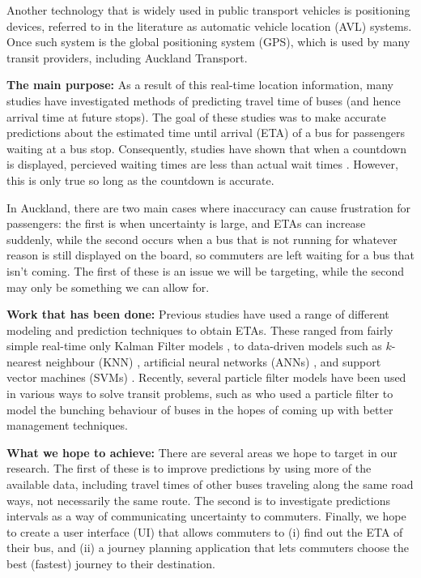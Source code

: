 \documentclass[12pt,a4paper]{article}
\begin{document}
Another technology that is widely used in public transport vehicles is positioning devices,
referred to in the literature as automatic vehicle location (AVL) systems.
Once such system is the global positioning system (GPS),
which is used by many transit providers, including Auckland Transport.

\textbf{The main purpose:}
As a result of this real-time location information, many studies have investigated methods of
predicting travel time of buses (and hence arrival time at future stops).
The goal of these studies was to make accurate predictions about the estimated time until arrival (ETA) 
of a bus for passengers waiting at a bus stop.
Consequently, studies have shown that when a countdown is displayed, percieved waiting times are less 
than actual wait times \citep{cn}.
However, this is only true so long as the countdown is accurate.

In Auckland, there are two main cases where inaccuracy can cause frustration for passengers:
the first is when uncertainty is large, and ETAs can increase suddenly, 
while the second occurs when a bus that is not running for whatever reason is still displayed 
on the board, so commuters are left waiting for a bus that isn't coming.
The first of these is an issue we will be targeting, while the second may only be something we can allow for.


\textbf{Work that has been done:}
Previous studies have used a range of different modeling and prediction techniques to obtain ETAs.
These ranged from fairly simple real-time only Kalman Filter models \citep{cn}, 
to data-driven models such as 
$k$-nearest neighbour (KNN) \citep{cn}, 
artificial neural networks (ANNs) \citep{cn}, 
and support vector machines (SVMs) \citep{cn}.
Recently, several particle filter models have been used in various ways to solve transit problems,
such as \cite{hans-etal:2015} who used a particle filter to model the bunching behaviour of buses
in the hopes of coming up with better management techniques.



\textbf{What we hope to achieve:}
There are several areas we hope to target in our research.
The first of these is to improve predictions by using more of the available data,
including travel times of other buses traveling along the same road ways, 
not necessarily the same route.
The second is to investigate predictions intervals as a way of communicating uncertainty to commuters.
Finally, we hope to create a user interface (UI) that allows commuters to (i) find out the ETA of their bus,
and (ii) a journey planning application that lets commuters choose the best (fastest) journey to their destination.
\end{document}
